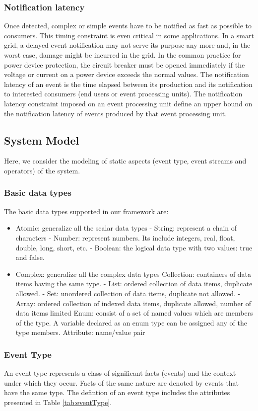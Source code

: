 \documentclass[a4paper,twoside]{article}
\begin{document}
\subsubsection{Notification latency}
Once detected, complex or simple events have to be notified as fast as possible to consumers. This timing constraint is even critical in some applications. In a smart grid, a delayed event notification may not serve its purpose any more and, in the worst case, damage might be incurred in the grid. In the common practice for power device protection, the circuit breaker must be opened immediately if the voltage or current on a power device exceeds the normal values. The notification latency of an event is the time elapsed between its production and its notification to interested consumers (end users or event processing units). The notification latency constraint imposed on an event processing unit define an upper bound on the notification latency of events produced by that event processing unit.
\subsection{System Model}
Here, we consider the modeling of static aspects (event type, event streams and operators) of the system.
\subsubsection{Basic data types}
The basic data types supported in our framework are:
\begin{itemize}
\item Atomic: generalize all the scalar data types
\subitem - String: represent a chain of characters
\subitem - Number: represent numbers. Its include integers, real, float, double, long, short, etc.  
\subitem - Boolean: the logical data type with two values: true and false.
\item Complex: generalize all the complex data types
\subitem Collection: containers of data items having the same type.
\subsubitem - List: ordered collection of data items, duplicate allowed.
\subsubitem - Set: unordered collection of data items, duplicate not allowed.
\subsubitem - Array: ordered collection of indexed data items,  duplicate allowed,  number of data items limited
\subitem Enum: consist of a set of named values which are members of the type. A variable declared as an enum type can be assigned any of the type members.
\subitem Attribute: name/value pair
\end{itemize}
\subsubsection{Event Type}
An event type represents a class of significant facts (events) and the context under which they occur. Facts of the same nature are denoted by events that have the same type. The defintion of an event type includes the attributes presented in Table \ref{tab:eventType}.
\end{document}
